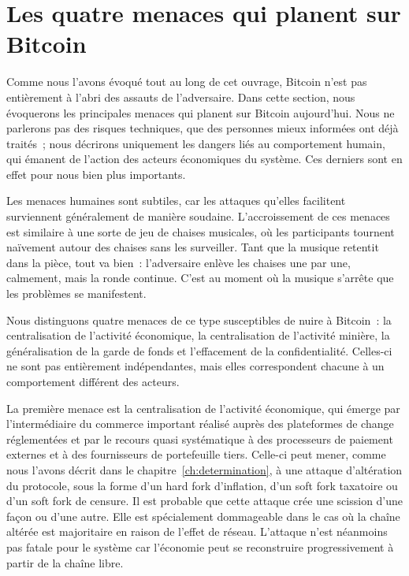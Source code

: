 
\section*{Les quatre menaces qui planent sur Bitcoin}

Comme nous l'avons évoqué tout au long de cet ouvrage, Bitcoin n'est pas entièrement à l'abri des assauts de l'adversaire. Dans cette section, nous évoquerons les principales menaces qui planent sur Bitcoin aujourd'hui. Nous ne parlerons pas des risques techniques, que des personnes mieux informées ont déjà traités~; nous décrirons uniquement les dangers liés au comportement humain, qui émanent de l'action des acteurs économiques du système. Ces derniers sont en effet pour nous bien plus importants.

Les menaces humaines sont subtiles, car les attaques qu'elles facilitent surviennent généralement de manière soudaine. L'accroissement de ces menaces est similaire à une sorte de jeu de chaises musicales, où les participants tournent naïvement autour des chaises sans les surveiller. Tant que la musique retentit dans la pièce, tout va bien~: l'adversaire enlève les chaises une par une, calmement, mais la ronde continue. C'est au moment où la musique s'arrête que les problèmes se manifestent.

Nous distinguons quatre menaces de ce type susceptibles de nuire à Bitcoin~: la centralisation de l'activité économique, la centralisation de l'activité minière, la généralisation de la garde de fonds et l'effacement de la confidentialité. Celles-ci ne sont pas entièrement indépendantes, mais elles correspondent chacune à un comportement différent des acteurs.

La première menace est la centralisation de l'activité économique, qui émerge par l'intermédiaire du commerce important réalisé auprès des plateformes de change réglementées et par le recours quasi systématique à des processeurs de paiement externes et à des fournisseurs de portefeuille tiers. Celle-ci peut mener, comme nous l'avons décrit dans le chapitre~\ref{ch:determination}, à une attaque d'altération du protocole, sous la forme d'un hard fork d'inflation, d'un soft fork taxatoire ou d'un soft fork de censure. Il est probable que cette attaque crée une scission d'une façon ou d'une autre. Elle est spécialement dommageable dans le cas où la chaîne altérée est majoritaire en raison de l'effet de réseau. L'attaque n'est néanmoins pas fatale pour le système car l'économie peut se reconstruire progressivement à partir de la chaîne libre.

